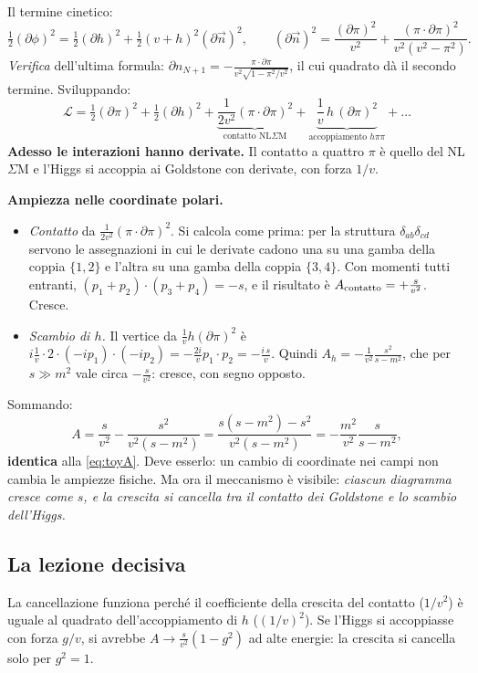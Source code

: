 \documentclass[11pt,a4paper]{article}
\numberwithin{equation}{section}
\theoremstyle{remark}
\begin{document}
Il termine cinetico:
\[
\tfrac12(\partial\phi)^2=\tfrac12(\partial h)^2+\tfrac12(v+h)^2(\partial\vec n)^2 ,\qquad(\partial\vec n)^2=\frac{(\partial\pi)^2}{v^2}+\frac{(\pi\cdot\partial\pi)^2}{v^2(v^2-\pi^2)} .
\]
\emph{Verifica} dell'ultima formula: $\partial n_{N+1}=-\frac{\pi\cdot\partial\pi}{v^2\sqrt{1-\pi^2/v^2}}$, il cui quadrato dà il secondo termine. Sviluppando:
\begin{equation}
\mathcal L=\tfrac12(\partial\pi)^2+\tfrac12(\partial h)^2+\underbrace{\frac{1}{2v^2}(\pi\cdot\partial\pi)^2}_{\text{contatto NL}\Sigma\text{M}}+\underbrace{\frac1v\,h\,(\partial\pi)^2}_{\text{accoppiamento }h\pi\pi}+\dots
\label{eq:toypolar}
\end{equation}
\textbf{Adesso le interazioni hanno derivate.} Il contatto a quattro $\pi$ è quello del NL$\Sigma$M e l'Higgs si accoppia ai Goldstone con derivate, con forza $1/v$.

\textbf{Ampiezza nelle coordinate polari.}
\begin{itemize}
\item \emph{Contatto} da $\frac{1}{2v^2}(\pi\cdot\partial\pi)^2$. Si calcola come prima: per la struttura $\delta_{ab}\delta_{cd}$ servono le assegnazioni in cui le derivate cadono una su una gamba della coppia $\{1,2\}$ e l'altra su una gamba della coppia $\{3,4\}$. Con momenti tutti entranti, $(p_1+p_2)\cdot(p_3+p_4)=-s$, e il risultato è $A_{\rm contatto}=+\frac{s}{v^2}$. Cresce.
\item \emph{Scambio di $h$.} Il vertice da $\frac1vh(\partial\pi)^2$ è $i\frac1v\cdot2\cdot(-ip_1)\cdot(-ip_2)=-\frac{2i}{v}p_1\cdot p_2=-\frac{i\,s}{v}$. Quindi $A_h=-\frac{1}{v^2}\frac{s^2}{s-m^2}$, che per $s\gg m^2$ vale circa $-\frac{s}{v^2}$: cresce, con segno opposto.
\end{itemize}
Sommando:
\[
A=\frac{s}{v^2}-\frac{s^2}{v^2(s-m^2)}=\frac{s(s-m^2)-s^2}{v^2(s-m^2)}=-\frac{m^2}{v^2}\frac{s}{s-m^2} ,
\]
\textbf{identica} alla \eqref{eq:toyA}. Deve esserlo: un cambio di coordinate nei campi non cambia le ampiezze fisiche. Ma ora il meccanismo è visibile: \emph{ciascun diagramma cresce come $s$, e la crescita si cancella tra il contatto dei Goldstone e lo scambio dell'Higgs.}

\subsection{La lezione decisiva}

La cancellazione funziona perché il coefficiente della crescita del contatto ($1/v^2$) è uguale al quadrato dell'accoppiamento di $h$ ($(1/v)^2$). Se l'Higgs si accoppiasse con forza $g/v$, si avrebbe $A\to\frac{s}{v^2}(1-g^2)$ ad alte energie: la crescita si cancella solo per $g^2=1$.
\end{document}
